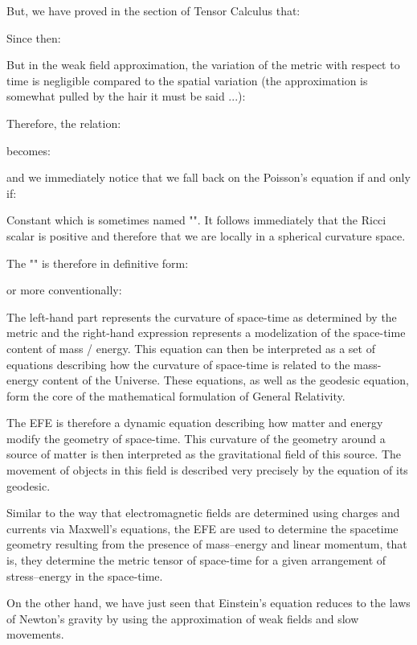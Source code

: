 	But, we have proved in the section of Tensor Calculus that:
	
	Since then:
	
	But in the weak field approximation, the variation of the metric with respect to time is negligible compared to the spatial variation (the approximation is somewhat pulled by the hair it must be said ...):
	
	Therefore, the relation:
	
	becomes:
	
	and we immediately notice that we fall back on the Poisson's equation if and only if:
	
	Constant which is sometimes named "". It follows immediately that the Ricci scalar is positive and therefore that we are locally in a spherical curvature space.

	The "" is therefore in definitive form:
	
	or more conventionally:
	
	The left-hand part represents the curvature of space-time as determined by the metric and the right-hand expression represents a modelization of the space-time content of mass / energy. This equation can then be interpreted as a set of equations describing how the curvature of space-time is related to the mass-energy content of the Universe. These equations, as well as the geodesic equation, form the core of the mathematical formulation of General Relativity.
	
	The EFE  is therefore a dynamic equation describing how matter and energy modify the geometry of space-time. This curvature of the geometry around a source of matter is then interpreted as the gravitational field of this source. The movement of objects in this field is described very precisely by the equation of its geodesic.
	
	Similar to the way that electromagnetic fields are determined using charges and currents via Maxwell's equations, the EFE are used to determine the spacetime geometry resulting from the presence of mass–energy and linear momentum, that is, they determine the metric tensor of space-time for a given arrangement of stress–energy in the space-time. 

	On the other hand, we have just seen that Einstein's equation reduces to the laws of Newton's gravity by using the approximation of weak fields and slow movements. 
	
